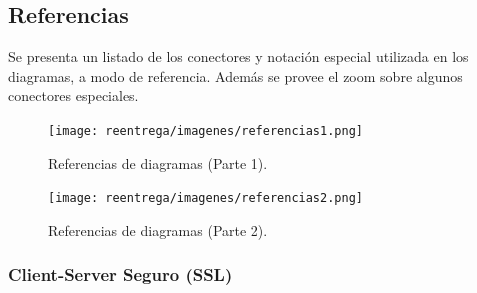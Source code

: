 \subsection{Referencias}

Se presenta un listado de los conectores y notación especial utilizada en los diagramas, a modo de referencia. Además se provee el zoom sobre algunos conectores especiales.

\begin{figure}[H]
   \centering
   \texttt{[image: reentrega/imagenes/referencias1.png]}
   \caption{Referencias de diagramas (Parte 1).}
\end{figure}

\newpage

\begin{figure}[H]
   \centering
   \texttt{[image: reentrega/imagenes/referencias2.png]}
   \caption{Referencias de diagramas (Parte 2).}
\end{figure}

\subsubsection{Client-Server Seguro (SSL)}



\newpage

